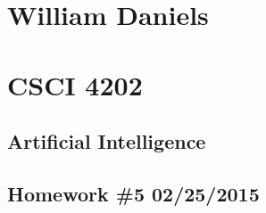 \documentclass[11pt]{article}
\begin{document}
\begin{center}
\section*{William Daniels}
\section*{CSCI 4202}
\subsection*{Artificial Intelligence}
\subsection*{Homework \#5 02/25/2015}
\end{center}
\end{document}
